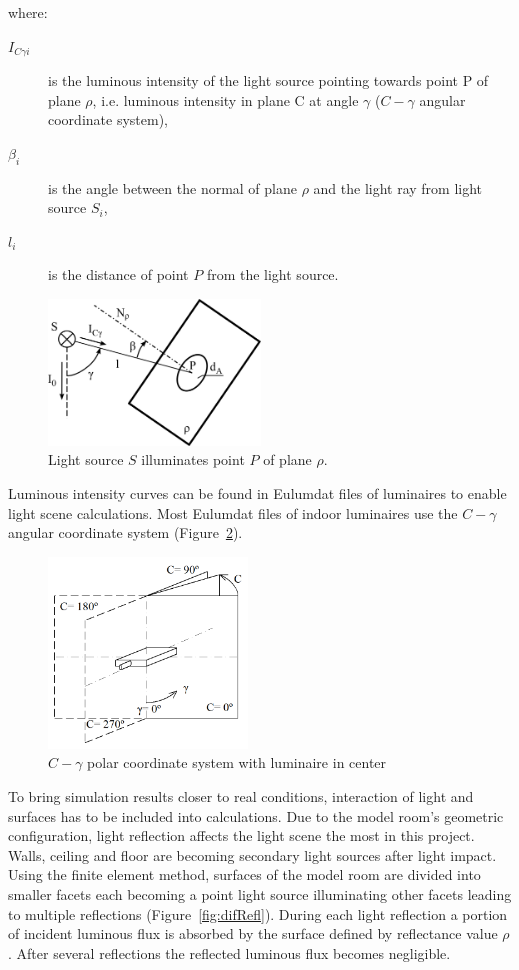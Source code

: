 \noindent where:
\begin{description}
	\item[$I_{C \gamma i}$] is the luminous intensity of the light source pointing towards point P of plane $\rho$, i.e. luminous intensity in plane C at angle $\gamma$ ($C-\gamma$ angular coordinate system),
	\item[$\beta_{i}$] is the angle between the normal of plane $\rho$ and the light ray from light source $S_{i}$,
	\item[$l_{i}$] is the distance of point $P$ from the light source.
\end{description}

\begin{figure}[htb]
  \centering
  \includegraphics[width=160pt]{315_osvetlenost_bodovym_zdrojem_2}
  \caption{Light source $S$ illuminates point $P$ of plane $\rho$.}
  \label{fig:osv}
\end{figure}

Luminous intensity curves can be found in Eulumdat files of luminaires to enable light scene calculations. Most Eulumdat files of indoor luminaires use the $C-\gamma$ angular coordinate system (Figure~\ref{fig:cgamma}).

\begin{figure}[htb]
  \centering
  \includegraphics[width=150pt]{Cgama}
  \caption{$C-\gamma$ polar coordinate system with luminaire in center}
  \label{fig:cgamma}
\end{figure}

To bring simulation results closer to real conditions, interaction of light and surfaces has to be included into calculations. Due to the model room's geometric configuration, light reflection affects the light scene the most in this project. Walls, ceiling and floor are becoming secondary light sources after light impact. Using the finite element method, surfaces of the model room are divided into smaller facets each becoming a point light source illuminating other facets leading to multiple reflections (Figure~\ref{fig:difRefl}). During each light reflection a portion of incident luminous flux is absorbed by the surface defined by reflectance value $\rho$. After several reflections the reflected luminous flux becomes negligible.

